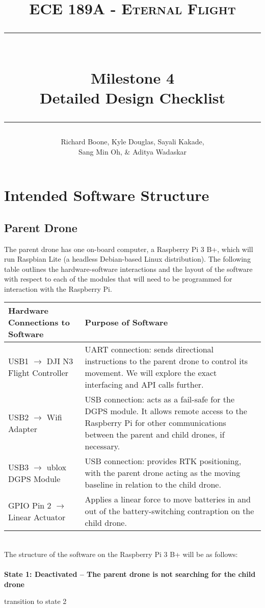 \documentclass[paper=a4, fontsize=10pt]{scrartcl}
\title{
		\vspace{-1in} 	
		\usefont{OT1}{bch}{b}{n}
		\normalfont \large \textsc{ECE 189A - Eternal Flight} \\ [10pt]
		\rule{\linewidth}{2pt} \\ [0.4cm]
		\Huge Milestone 4 \\
		\LARGE Detailed Design Checklist \\
		\rule{\linewidth}{2pt}
}
\author{
		\normalfont 
		\large Richard Boone, Kyle Douglas, Sayali Kakade, \\
		\large Sang Min Oh, \& Aditya Wadaskar \\ [-3pt]		 			%
}
\date{}
\begin{document}
\maketitle

\vspace{-0.5in}%
\section{Intended Software Structure}
\subsection*{Parent Drone}
The parent drone has one on-board computer, a Raspberry Pi 3 B+, which will run Raspbian Lite (a headless Debian-based Linux distribution). The following table outlines the hardware-software interactions and the layout of the software with respect to each of the modules that will need to be programmed for interaction with the Raspberry Pi.\\%
\begin{table}[h!]
	\centering
	\begin{tabular}{|l|p{}|}
		\hline
		\textbf{Hardware Connections to Software} & \textbf{Purpose of Software}\\%
		\hline
		\hline
		USB1 $\rightarrow$ DJI N3 Flight Controller & UART connection: sends directional instructions to the parent drone to control its movement. We will explore the exact interfacing and API calls further.\\%
		\hline
		USB2 $\rightarrow$ Wifi Adapter & USB connection: acts as a fail-safe for the DGPS module. It allows remote access to the Raspberry Pi for other communications between the parent and child drones, if necessary.\\%
		\hline
		USB3 $\rightarrow$ ublox DGPS Module & USB connection: provides RTK positioning, with the parent drone acting as the moving baseline in relation to the child drone.\\%
		\hline
		GPIO Pin 2 $\rightarrow$ Linear Actuator & Applies a linear force to move batteries in and out of the battery-switching contraption on the child drone.\\%
		\hline
	\end{tabular}
\end{table}
\hfill\\%
The structure of the software on the Raspberry Pi 3 B+ will be as follows:\\%
\\%
\textbf{State 1: Deactivated -- The parent drone is not searching for the child drone}\\%
\begin{algorithm}[H]
	transition to state 2\;
\end{algorithm}
\end{document}
